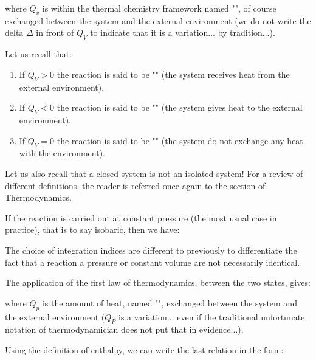 	where $Q_v$ is within the thermal chemistry framework named "", of course exchanged between the system and the external environment (we do not write the delta $\Delta$ in front of $Q_V$ to indicate that it is a variation... by tradition...).
	
	Let us recall that:
	
	\begin{enumerate}
		\item If $Q_V>0$ the reaction is said to be "" (the system receives heat from the external environment).
		
		\item If $Q_V<0$ the reaction is said to be "" (the system gives heat to the external environment).
		
		\item If $Q_V=0$ the reaction is said to be "" (the system do not exchange any heat with the environment).
	\end{enumerate}
	\begin{tcolorbox}[title=Remark,colframe=black,arc=10pt]
	Let us also recall that a closed system is not an isolated system! For a review of different definitions, the reader is referred once again to the section of Thermodynamics.
	\end{tcolorbox}
	
	If the reaction is carried out at constant pressure (the most usual case in practice), that is to say isobaric, then we have:
	
	\begin{tcolorbox}[title=Remark,colframe=black,arc=10pt]
	The choice of integration indices are different to previously to differentiate the fact that a reaction a pressure or constant volume are not necessarily identical.
	\end{tcolorbox}
	
	The application of the first law of thermodynamics, between the two states, gives:
	
	where $Q_p$ is the amount of heat, named "", exchanged between the system and the external environment ($Q_P$ is a variation... even if the traditional unfortunate notation of thermodynamician does not put that in evidence...).
	
	Using the definition of enthalpy, we can write the last relation in the form:
	
